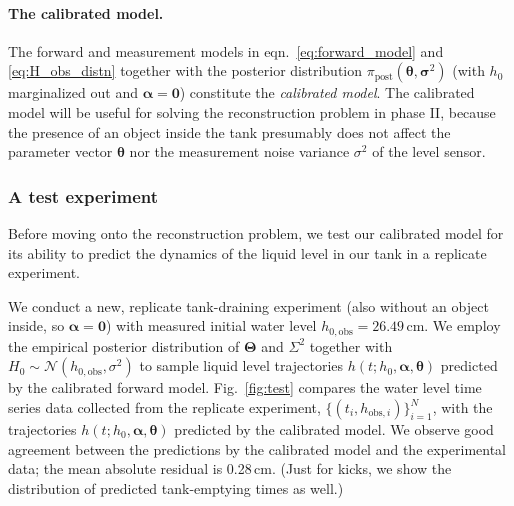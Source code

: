 \documentclass[openacc]{rsproca_new}%
\newcommand\thedata {$\{(t_i,h_{\text{obs}, i})\}_{i=1}^{N}$\xspace}
\newcommand\themodel {$h(t; h_0, \boldsymbol \alpha, \boldsymbol\theta)$\xspace}
\begin{document}
\paragraph{The calibrated model.} The forward and measurement models in eqn.~\ref{eq:forward_model} and \ref{eq:H_obs_distn} together with the posterior distribution $\pi_{\text{post}}(\boldsymbol \theta, \boldsymbol \sigma^2)$ (with $h_0$ marginalized out and $\boldsymbol \alpha=\mathbf{0}$) constitute the \emph{calibrated model}. The calibrated model will be useful for solving the reconstruction problem in phase II, because the presence of an object inside the tank presumably does not affect the parameter vector $\boldsymbol \theta$ nor the measurement noise variance $\sigma^2$ of the level sensor.

\subsubsection{A test experiment}
Before moving onto the reconstruction problem, we test our calibrated model for its ability to predict the dynamics of the liquid level in our tank in a replicate experiment.

We conduct a new, replicate tank-draining experiment (also without an object inside, so $\boldsymbol \alpha=\mathbf{0}$) with measured initial water level $h_{0, \text{obs}}=26.49$\,cm. 
We employ the empirical posterior distribution of $\boldsymbol \Theta$ and $\Sigma^2$ together with $H_0\sim \mathcal{N}(h_{0, \text{obs}}, \sigma^2)$ to sample liquid level trajectories \themodel predicted by the calibrated forward model. 
Fig.~\ref{fig:test} compares the water level time series data collected from the replicate experiment, \thedata, with the trajectories \themodel predicted by the calibrated model. We observe good agreement between the predictions by the calibrated model and the experimental data; the mean absolute residual is 0.28\,cm. (Just for kicks, we show the distribution of predicted tank-emptying times as well.)
\end{document}
